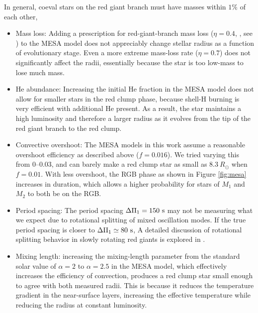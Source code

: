 In general, coeval stars on the red giant branch must have masses within $1\%$ of each other, 
\begin{itemize}
\item Mass loss: Adding a prescription for red-giant-branch mass loss ($\eta = 0.4$, , see \citealt{mig12,ren88}) to the MESA model does not appreciably change stellar radius as a function of evolutionary stage. Even a more extreme mass-loss rate ($\eta = 0.7$) does not significantly affect the radii, essentially because the star is too low-mass to lose much mass.
\item He abundance: Increasing the initial He fraction in the MESA model does not allow for smaller stars in the red clump phase, because shell-H burning is very efficient with additional He present. As a result, the star maintains a high luminosity and therefore a larger radius as it evolves from the tip of the red giant branch to the red clump.
\item Convective overshoot: The MESA models in this work assume a reasonable overshoot efficiency as described above ($f = 0.016$). We tried varying this from 0--0.03, and can barely make a red clump star as small as $8.3 \ R_\odot$ when $f = 0.01$. With less overshoot, the RGB phase as shown in Figure \ref{fig:mesa} increases in duration, which allows a higher probability for stars of $M_1$ and $M_2$ to both be on the RGB.
\item Period spacing: The period spacing $\Delta \Pi_1 = 150 \ \rm{s}$ may not be measuring what we expect due to rotational splitting of mixed oscillation modes. If the true period spacing is closer to $\Delta \Pi_1 \simeq 80 \ \rm{s}$,  A detailed discussion of rotational splitting behavior in slowly rotating red giants is explored in \citet{gou13}.
\item Mixing length:  increasing the mixing-length parameter from the standard solar value of $\alpha = 2$ to $\alpha = 2.5$ in the MESA model, which effectively increases the efficiency of convection, produces a red clump star small enough to agree with both measured radii. This is because it reduces the temperature gradient in the near-surface layers, increasing the effective temperature while reducing the radius at constant luminosity. 
\end{itemize}
